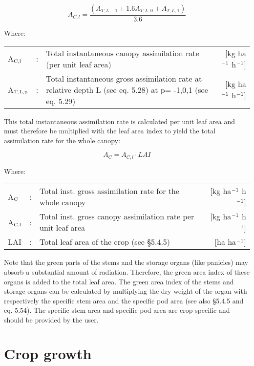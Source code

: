 \begin{equation}
A_{C,l} = {\frac{(A_{T,L,-1} + 1.6 A_{T,L,0} + A_{T,L,1})}{3.6}}
\end{equation}

Where:\\[5pt]
\begin{tabularx}{\textwidth}{llXr}
A$_{{\rm C,l}}$ &:& Total instantaneous canopy assimi\-la\-tion 
   rate (per unit leaf area)    &    [kg ha$^{{\rm -1}}$ h$^{{\rm -1}}$]\\
A$_{{\rm T,L,p}}$ &:& Total instantaneous gross assimilation rate at relative 
   depth L (see eq. 5.28) at p= -1,0,1 (see eq. 5.29)    &    
   [kg ha$^{{\rm -1}}$ h$^{{\rm -1}}$]\\
\end{tabularx}

This total instantaneous assimilation rate is calculated per unit leaf area and must
therefore be multiplied with the leaf area index to yield the total assimilation rate for the
whole canopy:

\begin{equation}
A_{C} = A_{C,l} \cdot LAI
\end{equation}

Where:\\[5pt]
\begin{tabularx}{\textwidth}{llXr}
A$_{{\rm C}}$ &:& Total inst. gross assimila\-tion rate for
   the whole canopy  &  [kg ha$^{{\rm -1}}$ h$^{{\rm -1}}$]\\
A$_{{\rm C,l}}$ &:& Total inst. gross canopy assimila\-tion rate 
   per unit leaf area &  [kg ha$^{{\rm -1}}$ h$^{{\rm -1}}$]\\
LAI &:& Total leaf area of the crop (see \S 5.4.5)  & [ha ha$^{{\rm -1}}$]\\
\end{tabularx}

Note that the green parts of the stems and the storage organs (like panicles) may absorb a
substantial amount of radiation. Therefore, the green area index of these organs is added
to the total leaf area. The green area index of the stems and storage organs can be
calculated by multiplying the dry weight of the organ with respectively the specific stem
area and the specific pod area (see also \S 5.4.5 and eq. 5.54). The specific stem area and
specific pod area are crop specific and should be provided by the user.


\section{Crop growth}

